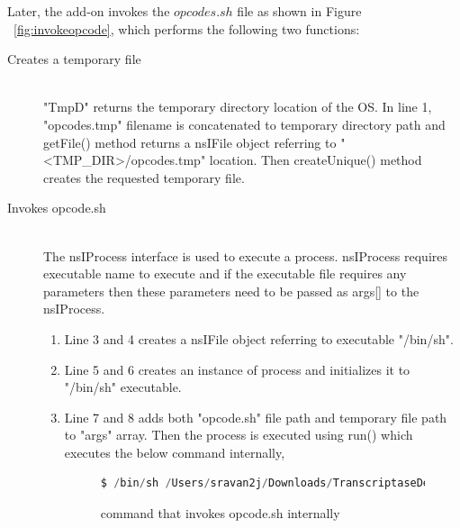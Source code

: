 Later, the add-on invokes the $opcodes.sh$ file as shown in Figure ~\ref{fig:invokeopcode}, which performs the following two functions:
\begin{description}
\item[Creates a temporary file] \hfill \\
"TmpD" returns the temporary directory location of the OS. In line 1, "opcodes.tmp" filename is concatenated to temporary directory path and getFile() method returns a nsIFile object referring to "<TMP\_DIR>/opcodes.tmp" location. Then createUnique() method creates the requested temporary file.
\item[Invokes opcode.sh] \hfill \\
The nsIProcess interface is used to execute a process. nsIProcess requires executable name to execute and if the executable file requires any parameters then these parameters need to be passed as args[] to the nsIProcess. 
\begin{enumerate}
\item Line 3 and 4 creates a nsIFile object referring to executable "/bin/sh". 
\item Line 5 and 6 creates an instance of process and initializes it to "/bin/sh" executable.
\item Line 7 and 8 adds both "opcode.sh" file path and temporary file path to "args" array. Then the process is executed using run() which executes the below command internally,
\begin{figure}[h]
  \centering
\begin{lstlisting}[frame=single,language=JavaScript,mathescape=false,numbers=none]
$ /bin/sh /Users/sravan2j/Downloads/TranscriptaseDetectionAddon/data/opcode.sh /tmp/opcodes.tmp
\end{lstlisting}
\caption[command that invokes opcode.sh internally]{command that invokes opcode.sh internally}
    \label{fig:invokeopcodeint}
\end{figure}
\end{enumerate}

\end{description}

